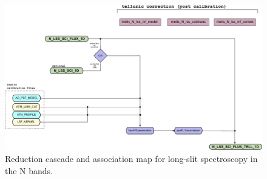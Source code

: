 \begin{landscape}
\begin{figure}[ht]
  \centering
  \includegraphics{figures/N_LSS_pipeline_wf_draft_latest_part_2_v0.83.pdf}
  \caption[Reduction cascade and association map for N long-slit
  spectroscopy]{Reduction cascade and association map for long-slit
    spectroscopy in the N bands. }
  \label{Fig:NLssAssomap2}
\end{figure}
\end{landscape}

